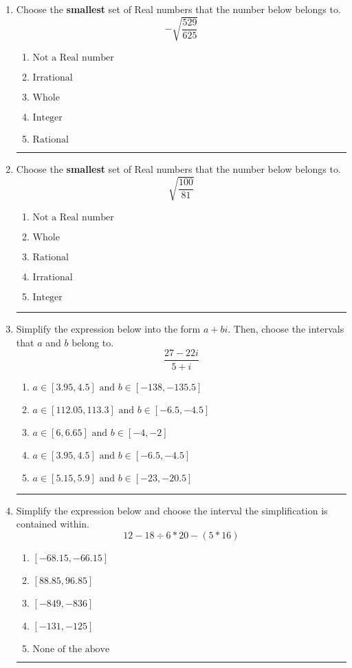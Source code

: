 \documentclass[14pt]{extbook}
\newcommand{\litem}[1]{\item#1\hspace*{-1cm}\rule{\textwidth}{0.4pt}}
\begin{document}
\begin{enumerate}
{\begin{enumerate}[label=\Alph*.]
\end{enumerate} }
\litem{
Choose the \textbf{smallest} set of Real numbers that the number below belongs to.\[ -\sqrt{\frac{529}{625}} \]\begin{enumerate}[label=\Alph*.]
\item \( \text{Not a Real number} \)
\item \( \text{Irrational} \)
\item \( \text{Whole} \)
\item \( \text{Integer} \)
\item \( \text{Rational} \)

\end{enumerate} }
\litem{
Choose the \textbf{smallest} set of Real numbers that the number below belongs to.\[ \sqrt{\frac{100}{81}} \]\begin{enumerate}[label=\Alph*.]
\item \( \text{Not a Real number} \)
\item \( \text{Whole} \)
\item \( \text{Rational} \)
\item \( \text{Irrational} \)
\item \( \text{Integer} \)

\end{enumerate} }
\litem{
Simplify the expression below into the form $a+bi$. Then, choose the intervals that $a$ and $b$ belong to.\[ \frac{27 - 22 i}{5 + i} \]\begin{enumerate}[label=\Alph*.]
\item \( a \in [3.95, 4.5] \text{ and } b \in [-138, -135.5] \)
\item \( a \in [112.05, 113.3] \text{ and } b \in [-6.5, -4.5] \)
\item \( a \in [6, 6.65] \text{ and } b \in [-4, -2] \)
\item \( a \in [3.95, 4.5] \text{ and } b \in [-6.5, -4.5] \)
\item \( a \in [5.15, 5.9] \text{ and } b \in [-23, -20.5] \)

\end{enumerate} }
\litem{
Simplify the expression below and choose the interval the simplification is contained within.\[ 12 - 18 \div 6 * 20 - (5 * 16) \]\begin{enumerate}[label=\Alph*.]
\item \( [-68.15, -66.15] \)
\item \( [88.85, 96.85] \)
\item \( [-849, -836] \)
\item \( [-131, -125] \)
\item \( \text{None of the above} \)


\end{enumerate}}
\end{enumerate}
\end{document}
